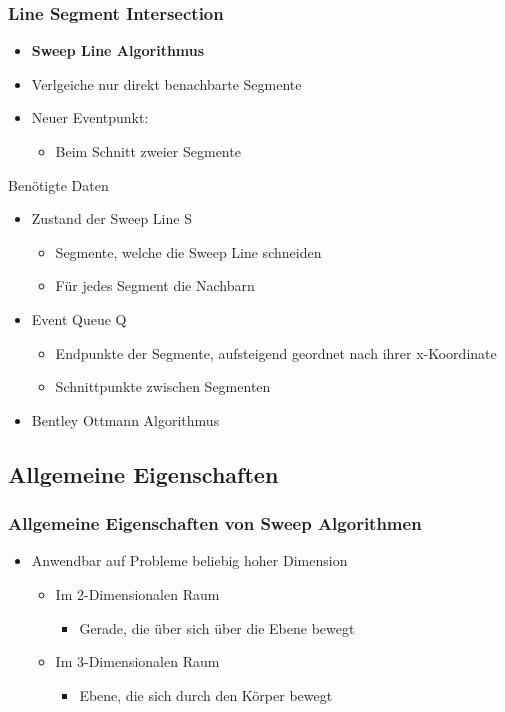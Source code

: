\begin{frame}
	\frametitle{{Line Segment Intersection}}
	\begin{itemize}
		\item \textbf{Sweep Line Algorithmus}
		\pause
		\item Verlgeiche nur direkt benachbarte Segmente
		\pause
		\item Neuer Eventpunkt:
		\begin{itemize}
			\pause
			\item Beim Schnitt zweier Segmente
		\end{itemize}
	\end{itemize}
	\pause
	\begin{block}{Ben\"otigte Daten}
		\begin{itemize}
			\item Zustand der Sweep Line S
			\begin{itemize}
				\item Segmente, welche die Sweep Line schneiden
				\pause
				\item F\"ur jedes Segment die Nachbarn
			\end{itemize}
			\pause
			\item Event Queue Q
			\begin{itemize}
				\item Endpunkte der Segmente, aufsteigend geordnet nach ihrer x-Koordinate
				\pause
				\item Schnittpunkte zwischen Segmenten
			\end{itemize}
		\end{itemize}
	\end{block}
	\pause
	\begin{itemize}
		\item Bentley Ottmann Algorithmus
	\end{itemize}
\end{frame}

\subsection{Allgemeine Eigenschaften}
\begin{frame}
	\frametitle{{Allgemeine Eigenschaften von Sweep Algorithmen}}
	\begin{itemize}
		\item Anwendbar auf Probleme beliebig hoher Dimension
		\begin{itemize}
			\pause
			\item{Im 2-Dimensionalen Raum}
			\begin{itemize}
				\item{Gerade, die \"uber sich über die Ebene bewegt}
			\end{itemize}
			\pause
			\item{Im 3-Dimensionalen Raum}
			\begin{itemize}
				\item{Ebene, die sich durch den K\"orper bewegt}
			\end{itemize}
		\end{itemize}
	\end{itemize}
\end{frame}


